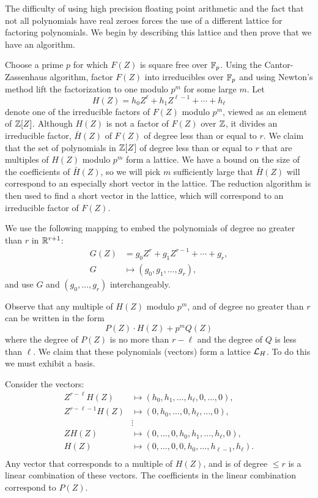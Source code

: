 \medskip
The difficulty of using high precision floating point arithmetic and
the fact that not all polynomials have real zeroes forces the use of a
different lattice for factoring polynomials.  We begin by describing
this lattice and then prove that we have an algorithm.

Choose a prime $p$ for which $F(Z)$ is square free over $\mathbb{F}_p$.  Using
the Cantor-Zassenhaus algorithm, factor $F(Z)$ into irreducibles over
$\mathbb{F}_p$ and using Newton's method lift the factorization to one modulo
$p^m$ for some large $m$.  Let
\[
H(Z) = h_0 Z^{\ell} + h_1 Z^{\ell-1} + \cdots + h_{\ell}
\]
denote one of the irreducible factors of $F(Z)$ modulo $p^m$, viewed
as an element of $\mathbb{Z}[Z]$.  Although $H(Z)$ is not a factor of $F(Z)$
over $\mathbb{Z}$, it divides an irreducible factor, $\bar{H}(Z)$ of $F(Z)$ of
degree less than or equal to $r$.  We claim that the set of
polynomials in $\mathbb{Z}[Z]$ of degree less than or equal to $r$ that are
multiples of $H(Z)$ modulo $p^m$ form a lattice.  We have a bound on
the size of the coefficients of $\bar{H}(Z)$, so we will pick $m$
sufficiently large that $\bar{H}(Z)$ will correspond to an especially
short vector in the lattice.  The {\Lovasz} reduction algorithm is
then used to find a short vector in the lattice, which will correspond
to an irreducible factor of $F(Z)$.

We use the following mapping to embed the polynomials of degree no 
greater than $r$ in $\mathbb{R}^{r+1}$:
\[
\begin{aligned}
G(Z) &= g_0 Z^{r} + g_1 Z^{r-1} + \cdots + g_{r}, \\
G & \mapsto (g_0, g_1, \ldots, g_r),
\end{aligned}
\]
and use $G$ and $(g_0, \ldots, g_r)$ interchangeably.

Observe that any multiple of $H(Z)$ modulo $p^m$, and of degree no 
greater than $r$ can be written in the form 
\[
P(Z) \cdot H(Z) + p^m Q(Z)
\]
where the degree of $P(Z)$ is no more than $r - \ell$ and the degree
of $Q$ is less than $\ell$.  We claim that these polynomials (vectors) 
form a lattice ${\cal L}_H$.  To do this we must exhibit a basis.

Consider the vectors:
\begin{equation} \label{First:LLL:Eq}
\begin{aligned}
Z^{r-\ell} H(Z) & \mapsto (h_0, h_1, \ldots, h_{\ell}, 0, \ldots, 0),
\\
Z^{r-\ell -1} H(Z) & \mapsto (0, h_0, \ldots, 0, h_{\ell}, \ldots, 0), \\
& \vdots\\
Z H(Z) & \mapsto (0, \ldots, 0, h_0, h_1, \ldots, h_{\ell}, 0), \\
H(Z) & \mapsto (0, \ldots, 0, 0, h_0, \ldots, h_{\ell -1}, h_{\ell}). \\
\end{aligned}
\end{equation}
Any vector that corresponds to a multiple of $H(Z)$, and is of degree
$\le r$ is a linear combination of these vectors.  The coefficients in
the linear combination correspond to $P(Z)$.  

